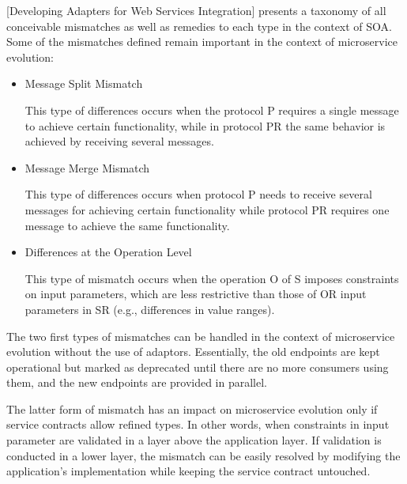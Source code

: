 [Developing Adapters for Web Services Integration] presents a taxonomy of all conceivable mismatches as well as remedies to each type in the context of SOA.
Some of the mismatches defined remain important in the context of microservice evolution:
\begin{itemize}
    \item Message Split Mismatch

    This type of differences occurs when the protocol P requires a single message to achieve certain functionality, while in protocol PR the same behavior is achieved by receiving several messages.
    \item Message Merge Mismatch

    This type of differences occurs when protocol P needs to receive several messages for achieving certain
    functionality while protocol PR requires one message to achieve the same functionality.
    \item Differences at the Operation Level

    This type of mismatch occurs when the operation O of S imposes constraints on input parameters,
    which are less restrictive than those of OR input parameters in SR (e.g., differences in value ranges).
\end{itemize}

The two first types of mismatches can be handled in the context of microservice evolution without the use of adaptors.
Essentially, the old endpoints are kept operational but marked as deprecated until there are no more consumers using them, and the new endpoints are provided in parallel.

The latter form of mismatch has an impact on microservice evolution only if service contracts allow refined types.
In other words, when constraints in input parameter are validated in a layer above the application layer.
If validation is conducted in a lower layer, the mismatch can be easily resolved by modifying the application's implementation while keeping the service contract untouched.
